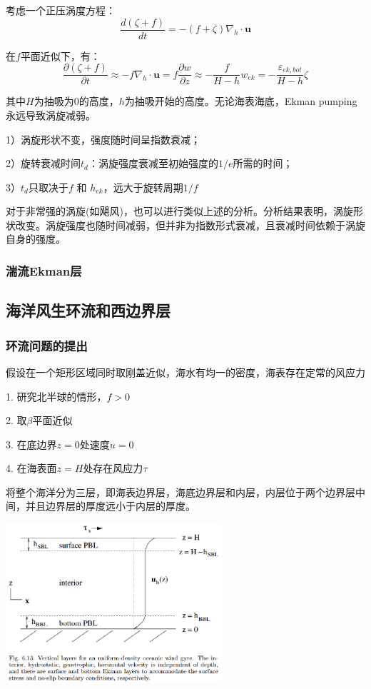 \documentclass{article}
\begin{document}
考虑一个正压涡度方程：
$$\frac{d(\zeta +f)}{dt}=-(f+\zeta ){{\nabla }_{h}}\cdot\mathbf{u}$$

在$f$平面近似下，有：
$$\frac{\partial(\zeta +f)}{\partial t}\approx-f{{\nabla }_{h}}\cdot\mathbf{u}=f\frac{\partial w}{\partial z}\approx-\frac{f}{H-h}w_{ek}=-\frac{{\varepsilon }_{ek,bot}}{H-h}\zeta$$

其中$H$为抽吸为$0$的高度，$h$为抽吸开始的高度。无论海表海底，Ekman pumping永远导致涡旋减弱。

1）涡旋形状不变，强度随时间呈指数衰减；

2）旋转衰减时间$t_d$：涡旋强度衰减至初始强度的$1/e$所需的时间；

3）$t_d$只取决于$f$ 和 $h_{ek}$，远大于旋转周期$1/f$

对于非常强的涡旋(如飓风)，也可以进行类似上述的分析。分析结果表明，涡旋形状改变。涡旋强度也随时间减弱，但并非为指数形式衰减，且衰减时间依赖于涡旋自身的强度。

\subsubsection{湍流Ekman层}

\subsection{海洋风生环流和西边界层}
\subsubsection{环流问题的提出}
假设在一个矩形区域同时取刚盖近似，海水有均一的密度，海表存在定常的风应力

1. 研究北半球的情形，$f>0$

2. 取$\beta$平面近似

3. 在底边界$z=0$处速度$u=0$

4. 在海表面$z=H$处存在风应力$\tau$

将整个海洋分为三层，即海表边界层，海底边界层和内层，内层位于两个边界层中间，并且边界层的厚度远小于内层的厚度。
\begin{center}
    \includegraphics[width=8cm]{Fig5_1.png}
\end{center}
\end{document}
